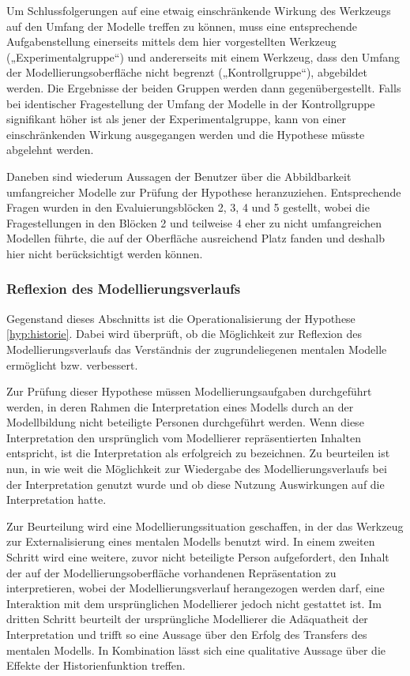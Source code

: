 Um Schlussfolgerungen auf eine etwaig einschränkende Wirkung des Werkzeugs auf den Umfang der Modelle treffen zu können, muss eine entsprechende Aufgabenstellung einerseits mittels dem hier vorgestellten Werkzeug („Experimentalgruppe“) und andererseits mit einem Werkzeug, dass den Umfang der Modellierungsoberfläche nicht begrenzt („Kontrollgruppe“), abgebildet werden. Die Ergebnisse der beiden Gruppen werden dann gegenübergestellt. Falls bei identischer Fragestellung der Umfang der Modelle in der Kontrollgruppe signifikant höher ist als jener der Experimentalgruppe, kann von einer einschränkenden Wirkung ausgegangen werden und die Hypothese müsste abgelehnt werden.

Daneben sind wiederum Aussagen der Benutzer über die Abbildbarkeit umfangreicher Modelle zur Prüfung der Hypothese heranzuziehen. Entsprechende Fragen wurden in den Evaluierungsblöcken 2, 3, 4 und 5 gestellt, wobei die Fragestellungen in den Blöcken 2 und teilweise 4 eher zu nicht umfangreichen Modellen führte, die auf der Oberfläche ausreichend Platz fanden und deshalb hier nicht berücksichtigt werden können.


\subsubsection{Reflexion des Modellierungsverlaufs} %
\label{ssub:reflexion_des_modellierungsverlaufs}

Gegenstand dieses Abschnitts ist die Operationalisierung der Hypothese \ref{hyp:historie}. Dabei wird überprüft, ob die Möglichkeit zur Reflexion des Modellierungsverlaufs das Verständnis der zugrundeliegenen mentalen Modelle ermöglicht bzw. verbessert.

Zur Prüfung dieser Hypothese müssen Modellierungsaufgaben durchgeführt werden, in deren Rahmen die Interpretation eines Modells durch an der Modellbildung nicht beteiligte Personen durchgeführt werden. Wenn diese Interpretation den ursprünglich vom Modellierer repräsentierten Inhalten entspricht, ist die Interpretation als erfolgreich zu bezeichnen. Zu beurteilen ist nun, in wie weit die Möglichkeit zur Wiedergabe des Modellierungsverlaufs bei der Interpretation genutzt wurde und ob diese Nutzung Auswirkungen auf die Interpretation hatte.

Zur Beurteilung wird eine Modellierungssituation geschaffen, in der das Werkzeug zur Externalisierung eines mentalen Modells benutzt wird. In einem zweiten Schritt wird eine weitere, zuvor nicht beteiligte Person aufgefordert, den Inhalt der auf der Modellierungsoberfläche vorhandenen Repräsentation zu interpretieren, wobei der Modellierungsverlauf herangezogen werden darf, eine Interaktion mit dem ursprünglichen Modellierer jedoch nicht gestattet ist. Im dritten Schritt beurteilt der ursprüngliche Modellierer die Adäquatheit der Interpretation und trifft so eine Aussage über den Erfolg des Transfers des mentalen Modells. In Kombination lässt sich eine qualitative Aussage über die Effekte der Historienfunktion treffen.    

